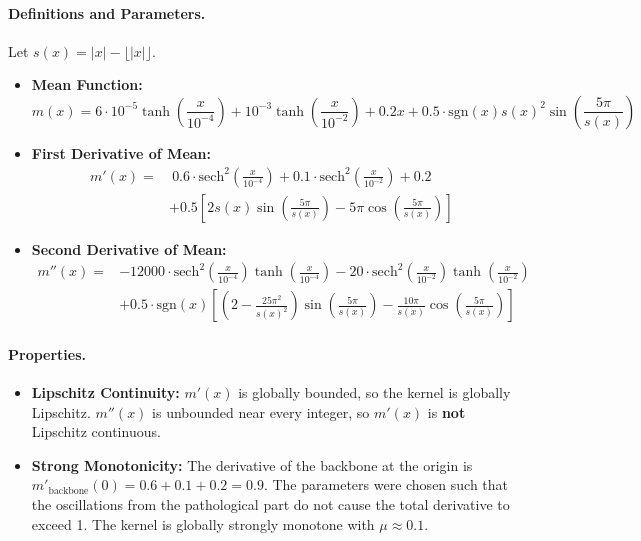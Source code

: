 \documentclass[a4paper]{article}
\begin{document}
\paragraph{Definitions and Parameters.}
Let $s(x) = |x| - \lfloor|x|\rfloor$.
\begin{itemize}
	\item \textbf{Mean Function:}
	\[ m(x) = 6 \cdot 10^{-5} \tanh\left(\frac{x}{10^{-4}}\right) + 10^{-3} \tanh\left(\frac{x}{10^{-2}}\right) + 0.2x + 0.5 \cdot \text{sgn}(x) s(x)^2 \sin\left(\frac{5\pi}{s(x)}\right) \]
	\item \textbf{First Derivative of Mean:}
	\[ \begin{aligned} m'(x) = & \ 0.6 \cdot \text{sech}^2\left(\frac{x}{10^{-4}}\right) + 0.1 \cdot \text{sech}^2\left(\frac{x}{10^{-2}}\right) + 0.2 \\ & + 0.5 \left[ 2s(x)\sin\left(\frac{5\pi}{s(x)}\right) - 5\pi\cos\left(\frac{5\pi}{s(x)}\right) \right] \end{aligned} \]
	\item \textbf{Second Derivative of Mean:}
	\[ \begin{aligned} m''(x) = & -12000 \cdot \text{sech}^2\left(\frac{x}{10^{-4}}\right)\tanh\left(\frac{x}{10^{-4}}\right) - 20 \cdot \text{sech}^2\left(\frac{x}{10^{-2}}\right)\tanh\left(\frac{x}{10^{-2}}\right) \\ & + 0.5 \cdot \text{sgn}(x)\left[\left(2 - \frac{25\pi^2}{s(x)^2}\right)\sin\left(\frac{5\pi}{s(x)}\right) - \frac{10\pi}{s(x)}\cos\left(\frac{5\pi}{s(x)}\right)\right] \end{aligned} \]
\end{itemize}
\paragraph{Properties.}
\begin{itemize}
	\item \textbf{Lipschitz Continuity:} $m'(x)$ is globally bounded, so the kernel is globally Lipschitz. $m''(x)$ is unbounded near every integer, so $m'(x)$ is \textbf{not} Lipschitz continuous.
	\item \textbf{Strong Monotonicity:} The derivative of the backbone at the origin is $m'_{\text{backbone}}(0) = 0.6 + 0.1 + 0.2 = 0.9$. The parameters were chosen such that the oscillations from the pathological part do not cause the total derivative to exceed 1. The kernel is globally strongly monotone with $\mu \approx 0.1$.
\end{itemize}
\end{document}
